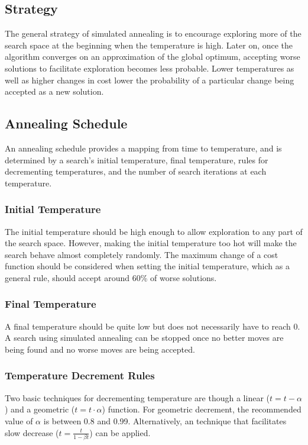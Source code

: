 \documentclass[12pt,titlepage]{article}
\begin{document}
    \subsection{Strategy}
      The general strategy of simulated annealing is to encourage exploring more of the search space at the beginning when the temperature is high. Later on, once the algorithm converges
      on an approximation of the global optimum, accepting worse solutions to facilitate exploration becomes less probable. Lower temperatures as well as higher changes in cost lower the
      probability of a particular change being accepted as a new solution.

    \subsection{Annealing Schedule}
      An annealing schedule provides a mapping from time to temperature, and is determined by a search's initial temperature, final temperature, rules for decrementing temperatures, and the
      number of search iterations at each temperature.

      \subsubsection{Initial Temperature}
        The initial temperature should be high enough to allow exploration to any part of the search space. However, making the initial temperature too hot will make the search behave almost
        completely randomly. The maximum change of a cost function should be considered when setting the initial temperature, which as a general rule, should accept around 60\% of worse
        solutions.

      \subsubsection{Final Temperature}
        A final temperature should be quite low but does not necessarily have to reach 0. A search using simulated annealing can be stopped once no better moves are being found and no
        worse moves are being accepted.

      \subsubsection{Temperature Decrement Rules}
        Two basic techniques for decrementing temperature are though a linear ($t = t - \alpha$) and a geometric ($t = t \cdot \alpha$) function. For geometric decrement, the recommended
        value of $\alpha$ is between 0.8 and 0.99. Alternatively, an technique that facilitates slow decrease ($t = \frac{t}{1 - \beta t}$) can be applied.
\end{document}
